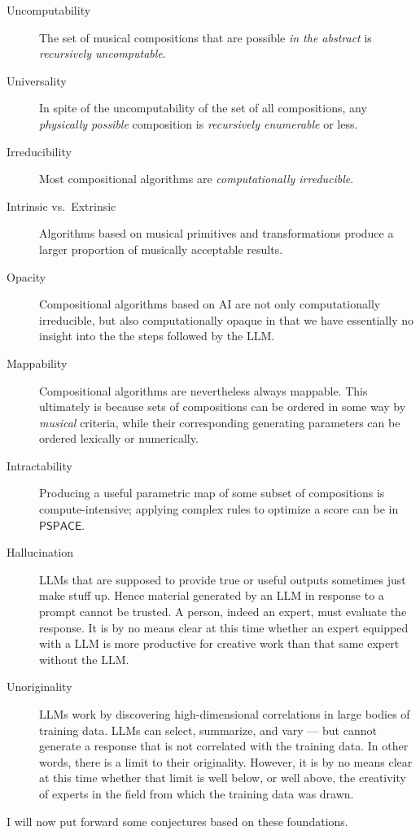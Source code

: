 \documentclass[]{interact}
\theoremstyle{plain}%
\theoremstyle{definition}
\theoremstyle{remark}
\begin{document}
\begin{description}
\item[Uncomputability] The set of musical compositions that are possible \emph{in the abstract} is \emph{recursively uncomputable}.
\item[Universality] In spite of the uncomputability of the set of all compositions, any \emph{physically possible} composition is \emph{recursively enumerable} or less.
\item[Irreducibility] Most compositional algorithms are \emph{computationally irreducible}.
\item[Intrinsic vs.\ Extrinsic] Algorithms based on musical primitives and transformations produce a larger proportion of musically acceptable results.
\item[Opacity] Compositional algorithms based on AI are not only computationally irreducible, but also computationally opaque in that we have essentially no insight into the the steps followed by the LLM.
\item[Mappability] Compositional algorithms are nevertheless always mappable. This ultimately is because sets of compositions can be ordered in some way by \emph{musical} criteria, while their corresponding generating parameters can be ordered lexically or numerically.
\item[Intractability] Producing a useful parametric map of some subset of compositions is compute-intensive; applying complex rules to optimize a score can be in $\mathsf{PSPACE}$.
\item[Hallucination] LLMs that are supposed to provide true or useful outputs sometimes just make stuff up. Hence material generated by an LLM in response to a prompt cannot be trusted. A person, indeed an expert, must evaluate the response. It is by no means clear at this time whether an expert equipped with a LLM is more productive for creative work than that same expert without the LLM.
\item[Unoriginality] LLMs work by discovering high-dimensional correlations in large bodies of training data. LLMs can select, summarize, and vary --- but cannot generate a response that is not correlated with the training data. In other words, there is a limit to their originality. However, it is by no means clear at this time whether that limit is well below, or well above, the creativity of experts in the field from which the training data was drawn.
\end{description}

I will now put forward some conjectures based on these foundations.
\end{document}
